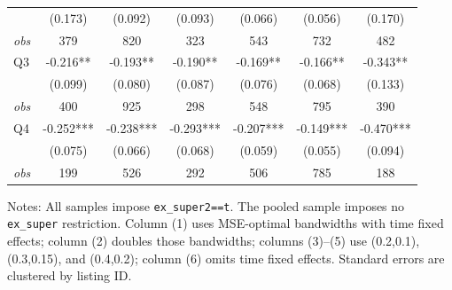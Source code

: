 \begin{table}[!htbp]
\begin{tabular}{lcccccc}
 & (0.173) & (0.092) & (0.093) & (0.066) & (0.056) & (0.170) \\
\textit{obs} & 379 & 820 & 323 & 543 & 732 & 482 \\
Q3 & -0.216** & -0.193** & -0.190** & -0.169** & -0.166** & -0.343** \\
 & (0.099) & (0.080) & (0.087) & (0.076) & (0.068) & (0.133) \\
\textit{obs} & 400 & 925 & 298 & 548 & 795 & 390 \\
Q4 & -0.252*** & -0.238*** & -0.293*** & -0.207*** & -0.149*** & -0.470*** \\
 & (0.075) & (0.066) & (0.068) & (0.059) & (0.055) & (0.094) \\
\textit{obs} & 199 & 526 & 292 & 506 & 785 & 188 \\
\bottomrule
\end{tabular}
\begin{minipage}{0.98\textwidth}\footnotesize
Notes: All samples impose \texttt{ex\_super2==t}. The pooled sample imposes no \texttt{ex\_super} restriction. Column (1) uses MSE-optimal bandwidths with time fixed effects; column (2) doubles those bandwidths; columns (3)--(5) use (0.2,0.1), (0.3,0.15), and (0.4,0.2); column (6) omits time fixed effects. Standard errors are clustered by listing ID.
\end{minipage}
\end{table}

